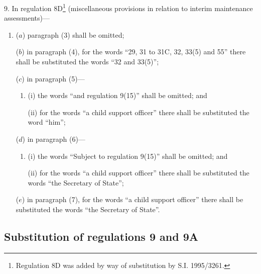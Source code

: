 \documentclass[12pt,a4paper]{article}
\begin{document}
9.  In regulation 8D\footnote{\frenchspacing Regulation 8D was added by way of substitution by S.I. 1995/3261.} (miscellaneous provisions in relation to interim maintenance assessments)---
\begin{enumerate}\item[]
($a$) paragraph (3) shall be omitted;

($b$) in paragraph (4), for the words “29, 31 to 31C, 32, 33(5) and 55” there shall be substituted the words “32 and 33(5)”;

($c$) in paragraph (5)---
\begin{enumerate}\item[]
(i) the words “and regulation 9(15)” shall be omitted; and

(ii) for the words “a child support officer” there shall be substituted the word “him”;
\end{enumerate}

($d$) in paragraph (6)---
\begin{enumerate}\item[]
(i) the words “Subject to regulation 9(15)” shall be omitted; and

(ii) for the words “a child support officer” there shall be substituted the words “the Secretary of State”;
\end{enumerate}

($e$) in paragraph (7), for the words “a child support officer” there shall be substituted the words “the Secretary of State”.
\end{enumerate}

\subsection[10. Substitution of regulations 9 and 9A]{Substitution of regulations 9 and 9A}
\end{document}
